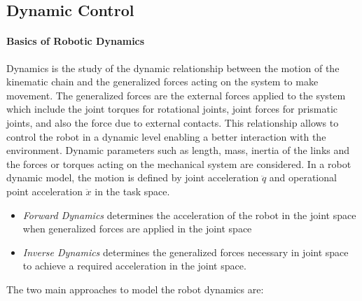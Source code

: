 \subsection{Dynamic Control}

\paragraph{Basics of Robotic Dynamics}
Dynamics is the study of the dynamic relationship between the motion of the kinematic chain and the generalized forces acting on the system to make movement. The generalized forces are the external forces applied to the system which include the joint torques for rotational joints, joint forces for prismatic joints, and also the force due to external contacts. This relationship allows to control the robot in a dynamic level enabling a better interaction with the environment. Dynamic parameters such as length, mass, inertia of the links and the forces or torques acting on the mechanical system are considered. In a robot dynamic model, the motion is defined by joint  acceleration $\ddot{q}$ and operational point acceleration $\ddot{x}$ in the task space. 

\begin{itemize}
    \item \textit{Forward Dynamics} determines the acceleration of the robot in the joint space when generalized forces are applied in the joint space
    \item \textit{Inverse Dynamics} determines the generalized forces necessary in joint space to achieve a required acceleration in the joint space.
\end{itemize}

The two main approaches to model the robot dynamics are:

